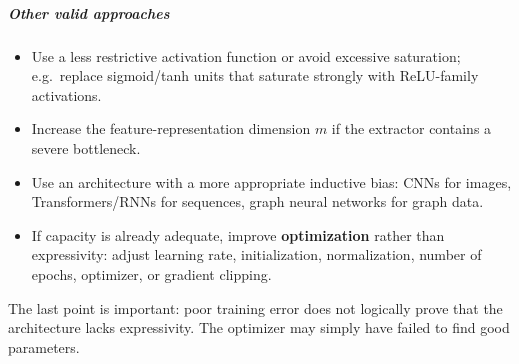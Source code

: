 \documentclass[11pt,a4paper]{article}
\theoremstyle{definition}
\begin{document}
\begin{center}
{%
}
\end{center}

\subparagraph{Other valid approaches}
\begin{itemize}
    \item Use a less restrictive activation function or avoid excessive saturation; e.g.\ replace sigmoid/tanh units that saturate strongly with ReLU-family activations.
    \item Increase the feature-representation dimension $m$ if the extractor contains a severe bottleneck.
    \item Use an architecture with a more appropriate inductive bias: CNNs for images, Transformers/RNNs for sequences, graph neural networks for graph data.
    \item If capacity is already adequate, improve \textbf{optimization} rather than expressivity: adjust learning rate, initialization, normalization, number of epochs, optimizer, or gradient clipping.
\end{itemize}

The last point is important: poor training error does not logically prove that the architecture lacks expressivity. The optimizer may simply have failed to find good parameters.
\end{document}
